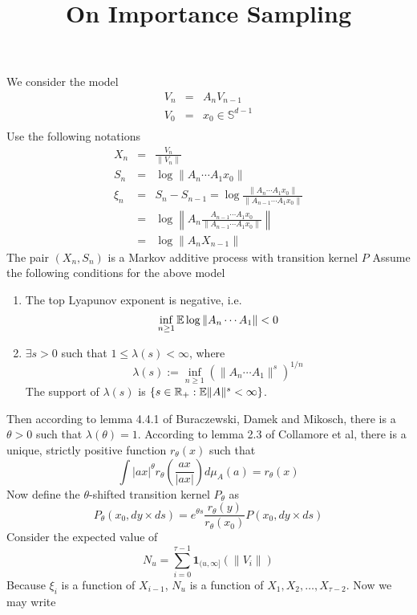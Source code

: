 \documentclass[12pt]{article}
\title{On Importance Sampling}
\begin{document}
\maketitle

We consider the model
\begin{eqnarray*}
V_n &=& A_n V_{n-1} \\
V_0 &=& x_0 \in \mathbb S^{d-1}\\
\end{eqnarray*}
Use the following notations
\begin{eqnarray*}
X_n &=& \frac{V_n}{\|V_n\|} \\
S_n &=& \log \|A_n \cdots A_1 x_0\| \\
\xi_n &=& S_n - S_{n-1} = \log\frac{\|A_n \cdots A_1 x_0\|}{\|A_{n-1} \cdots A_1 x_0\|} \\
&=& \log\left\| A_n \frac{A_{n-1} \cdots A_1 x_0}{\|A_{n-1} \cdots A_1 x_0\|} \right\|\\
&=& \log \|A_n X_{n-1}\|
\end{eqnarray*}
The pair $(X_n, S_n)$ is a Markov additive process with transition kernel $P$
Assume the following conditions for the above model
\begin{enumerate}
\item The top Lyapunov exponent is negative, i.e.
  $$
  \inf_{n \geq 1} \mathbb{E} \log \|A_n \cdots A_1\| < 0
  $$
\item $\exists s > 0$ such that $1 \leq \lambda(s) < \infty$, where
  $$
  \lambda(s) := \inf_{n \geq 1} (\|A_n \cdots A_1\|^s )^{1/n}
  $$
  The support of $\lambda(s)$ is $\{s \in \mathbb R_+: \mathbb{E} \|A\|^s < \infty\}$.
\end{enumerate}
Then according to lemma 4.4.1 of Buraczewski, Damek and Mikosch, there
is a $\theta > 0$ such that $\lambda(\theta) = 1$. According to lemma
2.3 of Collamore et al, there is a unique, strictly positive function
$r_\theta(x)$ such that
$$
\int |a x|^\theta r_\theta (\frac{a x}{|a x|}) d \mu_A(a) = r_\theta(x)
$$
Now define the $\theta$-shifted transition kernel $P_\theta$ as
$$
P_\theta(x_0, dy \times ds) = e^{\theta s} \frac{r_\theta(y)}{r_\theta(x_0)} P(x_0, dy \times ds)
$$
Consider the expected value of
$$
N_u = \sum_{i=0}^{\tau - 1} \mathbf 1_{(u, \infty]}(\|V_i\|)
$$
Because $\xi_i$ is a function of $X_{i-1}$, $N_u$ is a function of
$X_1, X_2, \dots, X_{\tau-2}$. Now we may write
\end{document}
